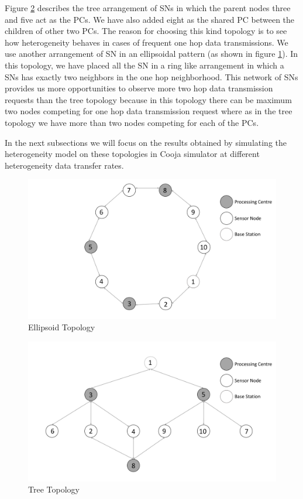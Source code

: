  \par
Figure \ref{fig:treeTopology} describes the tree arrangement of \acp{SN} in which the parent nodes three and five act as the \acp{PC}. We have also added eight as the shared \ac{PC} between the children of other two \acp{PC}. The reason for choosing this kind topology is to see how heterogeneity behaves in cases of frequent one hop data transmissions. We use another arrangement of \ac{SN} in an ellipsoidal pattern (as shown in figure \ref{fig:EllipsoidTopology}). In this topology, we have placed all the \ac{SN} in a ring like arrangement in which a \acp{SN} has exactly two neighbors in the one hop neighborhood. This network of \acp{SN} provides us more opportunities to observe more two hop data transmission requests than the tree topology because in this topology there can be maximum two nodes competing for one hop data transmission request where as in the tree topology we have more than two nodes competing for each of the \acp{PC}.

In the next subsections we will focus on the results obtained by simulating the heterogeneity model on these topologies in Cooja simulator at different heterogeneity data transfer rates. 

        \begin{figure}
        \centering
        \includegraphics[width=1.0\textwidth]{gfx/RPlots/Ellipsoid_topology.pdf}
        \caption{Ellipsoid Topology}
        \label{fig:EllipsoidTopology}
        \end{figure}
        	
        \begin{figure}
        \centering
        \includegraphics[width=1.0\textwidth]{gfx/RPlots/Tree_topology.pdf}
        \caption{Tree Topology}
        \label{fig:treeTopology}
        \end{figure}
        
